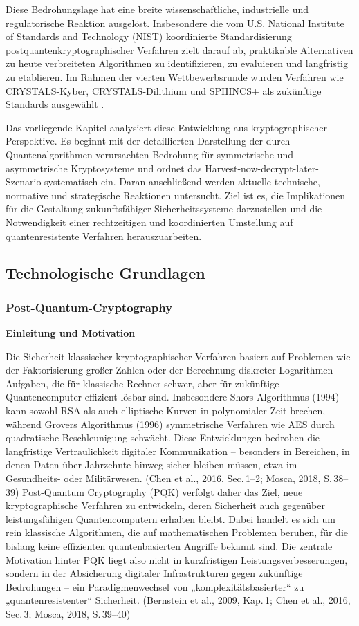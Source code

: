 Diese Bedrohungslage hat eine breite wissenschaftliche, industrielle und regulatorische Reaktion ausgelöst. Insbesondere die vom U.S. National Institute of Standards and Technology (NIST) koordinierte Standardisierung postquantenkryptographischer Verfahren zielt darauf ab, praktikable Alternativen zu heute verbreiteten Algorithmen zu identifizieren, zu evaluieren und langfristig zu etablieren. Im Rahmen der vierten Wettbewerbsrunde wurden Verfahren wie CRYSTALS-Kyber, CRYSTALS-Dilithium und SPHINCS+ als zukünftige Standards ausgewählt \cite{alagic_status_2025}.

Das vorliegende Kapitel analysiert diese Entwicklung aus kryptographischer Perspektive. Es beginnt mit der detaillierten Darstellung der durch Quantenalgorithmen verursachten Bedrohung für symmetrische und asymmetrische Kryptosysteme und ordnet das Harvest-now-decrypt-later-Szenario systematisch ein. Daran anschließend werden aktuelle technische, normative und strategische Reaktionen untersucht. Ziel ist es, die Implikationen für die Gestaltung zukunftsfähiger Sicherheitssysteme darzustellen und die Notwendigkeit einer rechtzeitigen und koordinierten Umstellung auf quantenresistente Verfahren herauszuarbeiten.

\subsection{Technologische Grundlagen}
\subsubsection{Post-Quantum-Cryptography}
\noindent\textbf{Einleitung und Motivation}

\noindent
Die Sicherheit klassischer kryptographischer Verfahren basiert auf Problemen wie der Faktorisierung großer Zahlen oder der Berechnung diskreter Logarithmen – Aufgaben, die für klassische Rechner schwer, aber für zukünftige Quantencomputer effizient lösbar sind. Insbesondere Shors Algorithmus (1994) kann sowohl RSA als auch elliptische Kurven in polynomialer Zeit brechen, während Grovers Algorithmus (1996) symmetrische Verfahren wie AES durch quadratische Beschleunigung schwächt. Diese Entwicklungen bedrohen die langfristige Vertraulichkeit digitaler Kommunikation – besonders in Bereichen, in denen Daten über Jahrzehnte hinweg sicher bleiben müssen, etwa im Gesundheits- oder Militärwesen.
 (Chen et al., 2016, Sec. 1–2; Mosca, 2018, S. 38–39)
Post-Quantum Cryptography (PQK) verfolgt daher das Ziel, neue kryptographische Verfahren zu entwickeln, deren Sicherheit auch gegenüber leistungsfähigen Quantencomputern erhalten bleibt. Dabei handelt es sich um rein klassische Algorithmen, die auf mathematischen Problemen beruhen, für die bislang keine effizienten quantenbasierten Angriffe bekannt sind. Die zentrale Motivation hinter PQK liegt also nicht in kurzfristigen Leistungsverbesserungen, sondern in der Absicherung digitaler Infrastrukturen gegen zukünftige Bedrohungen – ein Paradigmenwechsel von „komplexitätsbasierter“ zu „quantenresistenter“ Sicherheit.
 (Bernstein et al., 2009, Kap. 1; Chen et al., 2016, Sec. 3; Mosca, 2018, S. 39–40)


